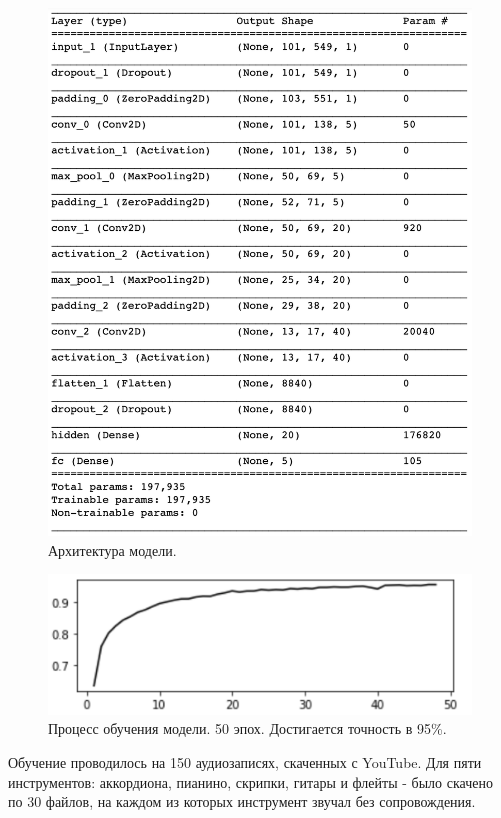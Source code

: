 \documentclass[14pt,a4paper]{article}
\begin{document}
\begin{figure}[H]
\centering
\includegraphics[scale=0.5]{img/model.png}
\caption{Архитектура модели.}
\end{figure}

\begin{figure}[H]
\centering
\includegraphics[scale=0.3]{img/training.png}
\caption{Процесс обучения модели. 50 эпох. Достигается точность в 95\%.}
\end{figure}

Обучение проводилось на 150 аудиозаписях, скаченных с YouTube. Для пяти инструментов: аккордиона, пианино, скрипки, гитары и флейты - было скачено по 30 файлов, на каждом из которых инструмент звучал без сопровождения. \\
\end{document}
